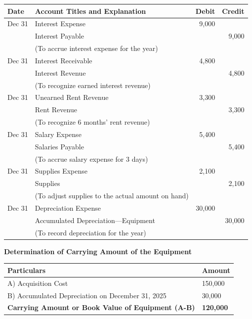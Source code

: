 \documentclass[12pt,a4paper]{book}
\begin{document}
\begin{center}
\begin{tabular}{|l|l|r|r|}
\hline
\textbf{Date} & \textbf{Account Titles and Explanation} & \textbf{Debit} & \textbf{Credit} \\
\hline
Dec 31 & Interest Expense & 9,000 & \\
       & Interest Payable & & 9,000 \\
       & (To accrue interest expense for the year) & & \\
\hline
Dec 31 & Interest Receivable & 4,800 & \\
       & Interest Revenue & & 4,800 \\
       & (To recognize earned interest revenue) & & \\
\hline
Dec 31 & Unearned Rent Revenue & 3,300 & \\
       & Rent Revenue & & 3,300 \\
       & (To recognize 6 months' rent revenue) & & \\
\hline
Dec 31 & Salary Expense & 5,400 & \\
       & Salaries Payable & & 5,400 \\
       & (To accrue salary expense for 3 days) & & \\
\hline
Dec 31 & Supplies Expense & 2,100 & \\
       & Supplies & & 2,100 \\
       & (To adjust supplies to the actual amount on hand) & & \\
\hline
Dec 31 & Depreciation Expense & 30,000 & \\
       & Accumulated Depreciation—Equipment & & 30,000 \\
       & (To record depreciation for the year) & & \\
\hline
\end{tabular}
\end{center}


\vspace{0.5cm}

\textbf{Determination of Carrying Amount of the Equipment}

\begin{center}
\begin{tabular}{|p{12cm}|p{3cm}|}
\hline
\textbf{Particulars} & \textbf{Amount} \\
\hline
A) Acquisition Cost & 150,000 \\
B) Accumulated Depreciation on December 31, 2025 & 30,000 \\
\hline
\textbf{Carrying Amount or Book Value of Equipment (A-B)} & \textbf{120,000} \\
\hline
\end{tabular}
\end{center}

\vspace{0.5cm}

\clearpage



\clearpage


\end{document}
